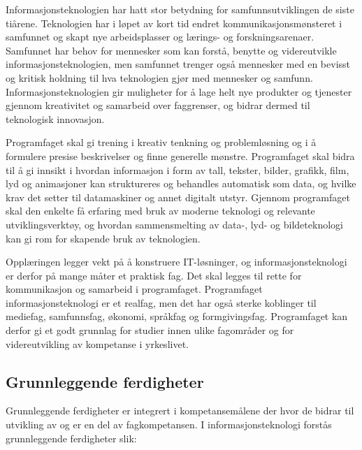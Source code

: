 \documentclass[%
oneside,                 %
final,                   %
12pt]{article}
\begin{document}
Informasjonsteknologien har hatt stor betydning for
samfunnsutviklingen de siste tiårene. Teknologien har i løpet av kort
tid endret kommunikasjonsmønsteret i samfunnet og skapt nye
arbeidsplasser og lærings- og forskningsarenaer. Samfunnet har behov
for mennesker som kan forstå, benytte og videreutvikle
informasjonsteknologien, men samfunnet trenger også mennesker med en
bevisst og kritisk holdning til hva teknologien gjør med mennesker og
samfunn. Informasjonsteknologien gir muligheter for å lage helt nye
produkter og tjenester gjennom kreativitet og samarbeid over
faggrenser, og bidrar dermed til teknologisk innovasjon.

Programfaget skal gi trening i kreativ tenkning og problemløsning og
i å formulere presise beskrivelser og finne generelle
mønstre. Programfaget skal bidra til å gi innsikt i hvordan
informasjon i form av tall, tekster, bilder, grafikk, film, lyd og
animasjoner kan struktureres og behandles automatisk som data, og
hvilke krav det setter til datamaskiner og annet digitalt
utstyr. Gjennom programfaget skal den enkelte få erfaring med bruk av
moderne teknologi og relevante utviklingsverktøy, og hvordan
sammensmelting av data-, lyd- og bildeteknologi kan gi rom for
skapende bruk av teknologien.

Opplæringen legger vekt på å konstruere IT-løsninger, og
informasjonsteknologi er derfor på mange måter et praktisk fag. Det
skal legges til rette for kommunikasjon og samarbeid i
programfaget. Programfaget informasjonsteknologi er et realfag, men
det har også sterke koblinger til mediefag, samfunnsfag, økonomi,
språkfag og formgivingsfag. Programfaget kan derfor gi et godt
grunnlag for studier innen ulike fagområder og for videreutvikling av
kompetanse i yrkeslivet.

\subsection{Grunnleggende ferdigheter}

Grunnleggende ferdigheter er integrert i kompetansemålene der hvor de
bidrar til utvikling av og er en del av fagkompetansen. I
informasjonsteknologi forstås grunnleggende ferdigheter slik:
\end{document}
